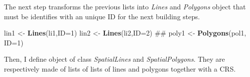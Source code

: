 \documentclass[]{report}
\newenvironment{Shaded}{\begin{snugshade}}{\end{snugshade}}
\newcommand{\DataTypeTok}[1]{\textcolor[rgb]{0.13,0.29,0.53}{#1}}
\newcommand{\DecValTok}[1]{\textcolor[rgb]{0.00,0.00,0.81}{#1}}
\newcommand{\KeywordTok}[1]{\textcolor[rgb]{0.13,0.29,0.53}{\textbf{#1}}}
\newcommand{\NormalTok}[1]{#1}
\newcommand{\OperatorTok}[1]{\textcolor[rgb]{0.81,0.36,0.00}{\textbf{#1}}}
\newcommand{\StringTok}[1]{\textcolor[rgb]{0.31,0.60,0.02}{#1}}
\begin{document}
\begin{Shaded}
\end{Shaded}

The next step transforms the previous lists into \emph{Lines} and
\emph{Polygons} object that must be identifies with an unique ID for the
next building steps.

\begin{Shaded}
\begin{Highlighting}[]
\NormalTok{lin1 <-}\StringTok{ }\KeywordTok{Lines}\NormalTok{(li1,}\DataTypeTok{ID=}\DecValTok{1}\NormalTok{)}
\NormalTok{lin2 <-}\StringTok{ }\KeywordTok{Lines}\NormalTok{(li2,}\DataTypeTok{ID=}\DecValTok{2}\NormalTok{)}
\NormalTok{##}
\NormalTok{poly1 <-}\StringTok{  }\KeywordTok{Polygons}\NormalTok{(pol1, }\DataTypeTok{ID=}\DecValTok{1}\NormalTok{)}
\end{Highlighting}
\end{Shaded}

Then, I define object of class \emph{SpatialLines} and
\emph{SpatialPolygons}. They are respectively made of lists of lists of
lines and polygons together with a CRS.
\end{document}
